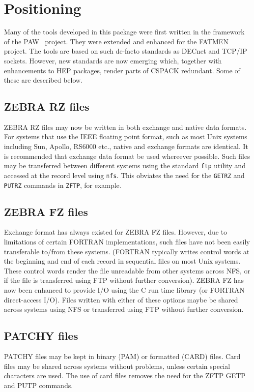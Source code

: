 \chapter{Positioning}
\par
Many of the tools developed in this package were first
written in the framework of the PAW~\cite{bib-PAW} project.
They were extended and enhanced for the FATMEN~\cite{bib-FATMEN}
project. The tools are based on such de-facto standards
as DECnet and TCP/IP sockets. However, new standards
are now emerging which, together with enhancements to HEP
packages, render parts of CSPACK redundant. Some of these
are described below.
\section{ZEBRA RZ files}
\par
ZEBRA RZ files may now be written in both exchange and native
data formats. For systems that use the IEEE floating point format,
such as most Unix systems including Sun, Apollo, RS6000 etc.,
native and exchange formats are identical. It is recommended
that exchange data format be used whereever possible. Such files
may be transferred between different systems using the standard
{\tt ftp} utility and accessed at the record level using {\tt nfs}.
This obviates the need for the {\tt GETRZ} and {\tt PUTRZ}
commands in {\tt ZFTP}, for example.
\section{ZEBRA FZ files}
\par
Exchange format has always existed for ZEBRA FZ files.
However, due to limitations of certain FORTRAN implementations,
such files have not been easily transferable to/from these systems.
(FORTRAN typically writes control words at the beginning and end
of each record in sequential files on most Unix systems. These control
words render the file unreadable from other systems across NFS,
or if the file is transferred using FTP without further conversion).
ZEBRA FZ has now been enhanced to provide I/O using the C run time
library (or FORTRAN direct-access I/O). Files written with either
of these options maybe be shared across systems using NFS or
transferred using FTP without further conversion.
\section{PATCHY files}
\par
PATCHY files may be kept in binary (PAM) or formatted (CARD) files.
Card files may be shared across systems without problems, unless
certain special characters are used. The use of card files removes
the need for the ZFTP GETP and PUTP commands.
